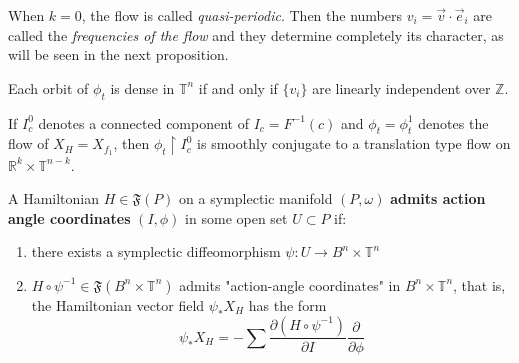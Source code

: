 When $k=0$, the flow is called \textit{quasi-periodic}. Then the numbers $v_i = \vec{v} \cdot \vec{e}_i$ are called the \textit{frequencies of the flow} and they determine completely its character, as will be seen in the next proposition.

\begin{prop}
    Each orbit of $\phi_t$ is dense in $\mathbb{T}^n$ if and only if $\{v_i\}$ are linearly independent over $\mathbb{Z}$.
\end{prop}

\begin{thm}
    If $I^0_c$ denotes a connected component of $I_c = F^{-1}(c)$ and $\phi_t = \phi^1_t$ denotes the flow of $X_H=X_{f_1}$, then $\phi_t \restriction I^0_c$ is smoothly conjugate to a translation type flow on $\mathbb{R}^k \times \mathbb{T}^{n-k}$.
\end{thm}

\begin{defn}
    A Hamiltonian $H \in \mathfrak{F}(P)$ on a symplectic manifold $(P,\omega)$ \textbf{admits action angle coordinates} $(I,\phi)$ in some open set $U \subset P$ if:

    \begin{enumerate}
        \item there exists a symplectic diffeomorphism $\psi: U \to B^n \times \mathbb{T}^n$
        \item $H \circ \psi^{-1} \in \mathfrak{F}(B^n \times \mathbb{T}^n)$ admits "action-angle coordinates" in $B^n \times \mathbb{T}^n$, that is, the Hamiltonian vector field $\psi_*X_H$ has the form
        \[ \psi_*X_H = - \sum \frac{\partial (H \circ \psi^{-1})}{\partial I} \frac{\partial}{\partial \phi} \]
    \end{enumerate}
\end{defn}

